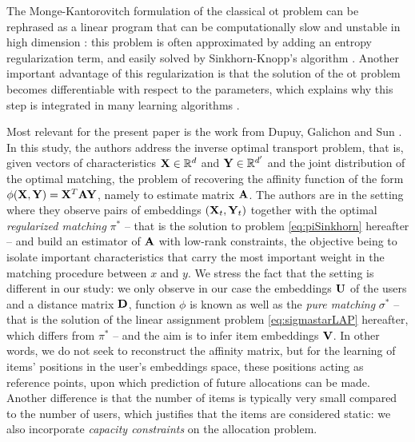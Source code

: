 The Monge-Kantorovitch formulation of the classical \ac{ot} problem can be
rephrased as a linear program that can be computationally slow and unstable in
high dimension \cite{cuturi_sinkhorn_2013}: this problem is often approximated
by adding an entropy regularization term, and easily solved by Sinkhorn-Knopp's
algorithm \cite{cuturi_sinkhorn_2013}. Another important advantage of this
regularization is that the solution of the \ac{ot} problem becomes
differentiable with respect to the parameters, which explains why this step is
integrated in many learning algorithms
\cite{genevay_learning_2017,cuturi_soft-dtw_2018,tai_sinkhorn_2021}.

Most relevant for the present paper is the work from Dupuy, Galichon and Sun
\cite{dupuy_estimating_2016}. In this study, the authors address the inverse
optimal transport problem, that is, given vectors of characteristics $\mathbf{X} \in
    \mathbb{R}^d$ and $\mathbf{Y} \in \mathbb{R}^{d'}$ and the joint distribution of the
optimal matching, the problem of recovering the affinity function of the form
$\phi(\mathbf{X},\mathbf{Y})=\mathbf{X}^T \mathbf{A} \mathbf{Y}$, namely to estimate matrix $\mathbf{A}$. The authors are
in the setting where they observe pairs of embeddings $(\mathbf{X}_t,\mathbf{Y}_t)$ together
with the optimal \emph{regularized matching} $\pi^*$ -- that is the solution to
problem \eqref{eq:piSinkhorn} hereafter -- and build an estimator of $\mathbf{A}$ with
low-rank constraints, the objective being to isolate important characteristics
that carry the most important weight in the matching procedure between $x$ and
$y$. We stress the fact that the setting is different in our study:
we only observe in our case the embeddings $\mathbf{U}$ of the users and a distance
matrix $\mathbf{D}$, function $\phi$ is known as well as the \emph{pure matching}
$\sigma^*$ -- that is the solution of the linear assignment problem
\eqref{eq:sigmastarLAP} hereafter, which differs from $\pi^*$ -- and the aim is
to infer item embeddings $\mathbf{V}$. In other words, we do not seek to reconstruct
the affinity matrix, but for the learning of items' positions in the user's
embeddings space, these positions acting as reference points, upon which
prediction of future allocations can be made. Another difference is that the
number of items is typically very small compared to the number of users, which
justifies that the items are considered static: we also incorporate
\emph{capacity constraints} on the allocation problem.

